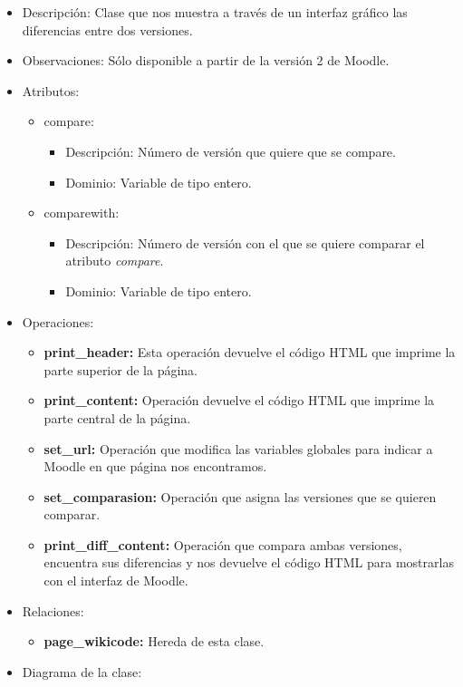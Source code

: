 \begin{itemize}
	\item Descripción: Clase que nos muestra a través de un interfaz gráfico las diferencias entre dos versiones.
	\item Observaciones: Sólo disponible a partir de la versión 2 de Moodle.
	\item Atributos:
		\begin{itemize}
			\item compare:
				\begin{itemize}
					\item Descripción: Número de versión que quiere que se compare.
					\item Dominio: Variable de tipo entero.
				\end{itemize}
			\item comparewith:
				\begin{itemize}
					\item Descripción: Número de versión con el que se quiere comparar el atributo \emph{compare}.
					\item Dominio: Variable de tipo entero.
				\end{itemize}
		\end{itemize}
	\item Operaciones:
		\begin{itemize}
			\item \textbf{print\_header: }Esta operación devuelve el código HTML que imprime la parte superior de la página.
			\item \textbf{print\_content: }Operación devuelve el código HTML que imprime la parte central de la página.
			\item \textbf{set\_url: }Operación que modifica las variables globales para indicar a Moodle en que página nos encontramos.
			\item \textbf{set\_comparasion: }Operación que asigna las versiones que se quieren comparar.
			\item \textbf{print\_diff\_content: }Operación que compara ambas versiones, encuentra sus diferencias y nos devuelve el código HTML para mostrarlas con el interfaz de Moodle.
		\end{itemize}
	\item Relaciones:
		\begin{itemize}
			\item \textbf{page\_wikicode:} Hereda de esta clase.
		\end{itemize}
	\item Diagrama de la clase:

\end{itemize}
